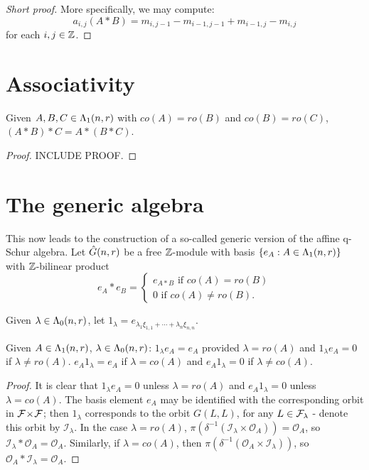 \documentclass[a4paper, 11pt]{report}
\begin{document}
\begin{proof}[Short proof]
More specifically, we may compute:
\begin{equation*}
a_{i,j}(A\ast B) = m_{i,j-1} - m_{i-1,j-1} + m_{i-1,j} - m_{i,j}
\end{equation*}
for each $i,j\in\mathbb{Z}$.

\end{proof}


\section{Associativity}

\begin{proposition}\label{proposition:associativity-maximum}
Given $A,B,C\in\Lambda_1(n,r)$ with $co(A)=ro(B)$ and $co(B)=ro(C)$, $(A\ast B)\ast C = A\ast (B\ast C)$.
\end{proposition}
\begin{proof}
INCLUDE PROOF.
\end{proof}

\section{The generic algebra}

This now leads to the construction of a so-called generic version of the affine q-Schur algebra. Let $\hat{G}(n,r)$ be a free $\mathbb{Z}$-module with basis $\{e_A:A\in\Lambda_1(n,r)\}$ with $\mathbb{Z}$-bilinear product
\begin{equation*}
e_A\ast e_B = \begin{cases}
e_{A\ast B} \text{ if } co(A)=ro(B)\\
0 \text{ if } co(A)\neq ro(B).
\end{cases}
\end{equation*}

Given $\lambda\in\Lambda_0(n,r)$, let $1_\lambda = e_{\lambda_1\xi_{1,1} + \cdots + \lambda_n\xi_{n,n}}$.

\begin{lemma}\label{lemma:one-sided-identity}
Given $A\in\Lambda_1(n,r)$, $\lambda\in\Lambda_0(n,r)$: $1_\lambda e_A = e_A$ provided  $\lambda = ro(A)$ and $1_\lambda e_A = 0$ if $\lambda\neq ro(A)$. $e_A1_\lambda = e_A$ if $\lambda = co(A)$ and $e_A 1_\lambda = 0$ if $\lambda \neq co(A)$.
\end{lemma}
\begin{proof}
It is clear that $1_\lambda e_A=0$ unless $\lambda = ro(A)$ and $e_A 1_\lambda = 0$ unless $\lambda = co(A)$. The basis element $e_A$ may be identified with the corresponding orbit in ${\mathcal{F}\!\times\!\mathcal{F}}$; then $1_{\lambda}$ corresponds to the orbit $G(L,L)$, for any $L\in\mathcal{F}_\lambda$ - denote this orbit by $\mathcal{I}_\lambda$. In the case $\lambda = ro(A)$, $\pi(\delta^{-1}(\mathcal{I}_\lambda\times\mathcal{O}_A)) = \mathcal{O}_A$, so $\mathcal{I}_\lambda\ast \mathcal{O}_A = \mathcal{O}_A$. Similarly, if $\lambda = co(A)$, then $\pi(\delta^{-1}(\mathcal{O}_A\times\mathcal{I}_\lambda))$, so $\mathcal{O}_A\ast \mathcal{I}_\lambda = \mathcal{O}_A$.
\end{proof}
\end{document}
